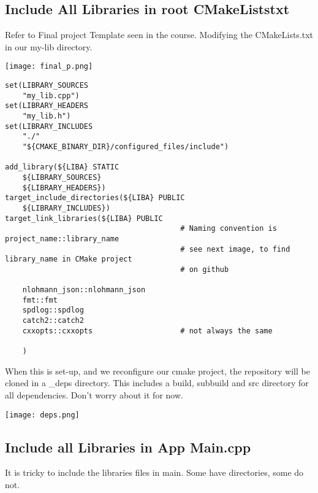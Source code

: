 \documentclass[openany]{report}
\begin{document}
\subsection{Include All Libraries in root CMakeListstxt}

Refer to Final project Template seen in the course. Modifying the CMakeLists.txt in our my-lib directory.

\begin{center}
    \texttt{[image: final\_p.png]}
\end{center}

\begin{verbatim}
set(LIBRARY_SOURCES
    "my_lib.cpp")
set(LIBRARY_HEADERS
    "my_lib.h")
set(LIBRARY_INCLUDES
    "./"
    "${CMAKE_BINARY_DIR}/configured_files/include")

add_library(${LIBA} STATIC
    ${LIBRARY_SOURCES}
    ${LIBRARY_HEADERS})
target_include_directories(${LIBA} PUBLIC
    ${LIBRARY_INCLUDES})
target_link_libraries(${LIBA} PUBLIC
                                        # Naming convention is project_name::library_name
                                        # see next image, to find library_name in CMake project
                                        # on github
    
    nlohmann_json::nlohmann_json
    fmt::fmt
    spdlog::spdlog
    catch2::catch2
    cxxopts::cxxopts                    # not always the same

    )
\end{verbatim}

When this is set-up, and we reconfigure our cmake project, the repository will be cloned in a \_deps directory. This includes
a build, subbuild and src directory for all dependencies. Don't worry about it for now.

\begin{center}
    \texttt{[image: deps.png]}
\end{center}


\subsection{Include all Libraries in App Main.cpp}

It is tricky to include the libraries files in main. Some have directories, some do not.
\end{document}
